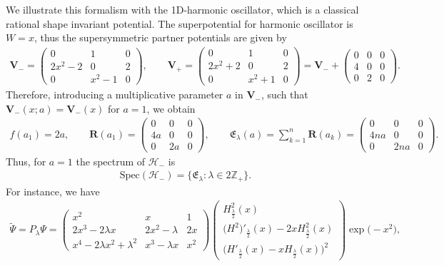 \documentclass[pdftex]{sigma}%
\numberwithin{equation}{section}
\begin{document}
We illustrate this formalism with the 1D-harmonic oscillator, which is a classical rational shape invariant potential. The superpotential for harmonic oscillator is $W=x$, thus the supersymmetric partner potentials are given by
\begin{gather*}
\mathbf{V}_-=\begin{pmatrix}0&1&0\\2x^2- 2&0&2\\0&x^2-1&0\end{pmatrix}\!, \qquad \mathbf{V}_+=\begin{pmatrix}0&1&0\\2x^2+2&0&2\\0&x^2+1&0\end{pmatrix}
=\mathbf{V}_-+\begin{pmatrix}0&0&0\\4&0&0\\0&2&0\end{pmatrix}\!.
\end{gather*}
Therefore, introducing a multiplicative parameter $a$ in $\mathbf{V}_-$, such that $\mathbf{V}_-(x;a)=\mathbf{V}_-(x)$ for $a=1$, we obtain
\begin{gather*}
f(a_1)=2a,\qquad \mathbf{R}(a_1)=\begin{pmatrix}0&0&0\\4a&0&0\\0&2a&0\end{pmatrix}\!,\qquad \mathfrak{E}_{\lambda} (a) = \sum_{k=1}^n \mathbf{R}(a_k)=\begin{pmatrix}0&0&0\\4na&0&0\\0&2na&0\end{pmatrix}\!.
\end{gather*}
Thus, for $a=1$ the spectrum of $\mathcal H_-$ is
\begin{gather*}
\mathrm{Spec}(\mathcal H_-)=\{\mathfrak E_\lambda\colon\lambda\in 2\mathbb{Z}_+\}.
\end{gather*}
For instance, we have
\begin{gather*}
\widetilde{\Psi}=P_\lambda\Psi=\begin{pmatrix}
x^2&x&1\\2x^3-2\lambda x&2x^2-\lambda&2x\\x^4-2\lambda x^2+\lambda^2&x^3-\lambda x&x^2
\end{pmatrix}\begin{pmatrix}
H^2_{\frac{\lambda}{2}}(x)
\\
\big(H^2\big)'_{\frac{\lambda}{2}}(x)-2xH^2_{\frac{\lambda}{2}}(x)
\\
\big(H'_{\frac{\lambda}{2}}(x)-xH_{\frac{\lambda}{2}}(x)\big)^2
\end{pmatrix}\exp\bigl(-x^2\bigr),
\end{gather*}
\end{document}
